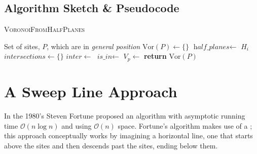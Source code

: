 \documentclass[12pt,twoside]{reedthesis}
\begin{document}
    \subsection{Algorithm Sketch \& Pseudocode} %
    \label{sub:alg_sketch_brutal}
      \begin{algorithm}[H]
      \caption{\textsc{VoronoiFromHalfPlanes}}\label{VoronoiHalfPlane}
      \begin{algorithmic}[1]
      \Require Set of sites, $P$, which are in \emph{general position}
      \State $\mbox{Vor}(P)\gets \{\} $
        \State $\textit{half\_planes}\gets$ $H_{i}$  
        \State $\textit{intersections}\gets \{\} $ 
          \State $inter \gets$ 
          \State $\textit{is\_in}\gets$ 
            \State {}
          \EndIf
        \EndFor
        \State $V_{p}\gets$
        \State {}
      \EndFor
      \State \textbf{return} $\mbox{Vor}(P)$
      \EndProcedure
      \end{algorithmic} 
      \end{algorithm}


  

  \section{A Sweep Line Approach} %
  \label{sec:fortune_s_algorithm}
    In the 1980's Steven Fortune proposed an algorithm with asymptotic running time $\mathcal{O}(n\log n)$ and using $\mathcal{O}(n)$ space. Fortune's algorithm makes use of a ; this approach conceptually works by imagining a horizontal line, one that starts above the sites and then descends past the sites, ending below them.
\end{document}
